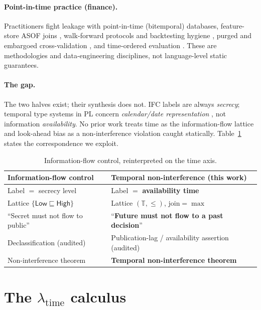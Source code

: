 \documentclass[11pt]{article}
\newcommand{\lt}{$\lambda_{\text{time}}$}
\theoremstyle{plain}
\theoremstyle{definition}
\begin{document}
\paragraph{Point-in-time practice (finance).}
Practitioners fight leakage with point-in-time (bitemporal) databases,
feature-store ASOF joins \citep{feast}, walk-forward protocols and backtesting
hygiene \citep{arnott2019backtesting}, purged and embargoed cross-validation
\citep{lopezdeprado2018advances}, and time-ordered evaluation
\citep{bergmeir2012use}. These are methodologies and data-engineering
disciplines, not language-level static guarantees.

\paragraph{The gap.}
The two halves exist; their synthesis does not. IFC labels are always
\emph{secrecy}; temporal type systems in PL concern \emph{calendar/date
representation} \citep{bry2005catts,tc39temporal}, not information
\emph{availability}. No prior work treats time as the information-flow lattice
and look-ahead bias as a non-interference violation caught statically.
Table~\ref{tab:mapping} states the correspondence we exploit.

\begin{table}[t]\centering\small
\begin{tabular}{ll}
\toprule
Information-flow control & Temporal non-interference (this work) \\
\midrule
Label $=$ secrecy level & Label $=$ \textbf{availability time} \\
Lattice $\{\textsf{Low}\sqsubseteq\textsf{High}\}$ & Lattice $(\mathbb{T},\le)$, $\text{join}=\max$ \\
``Secret must not flow to public'' & ``\textbf{Future must not flow to a past decision}'' \\
Declassification (audited) & Publication-lag / availability assertion (audited) \\
Non-interference theorem & \textbf{Temporal non-interference theorem} \\
\bottomrule
\end{tabular}
\caption{Information-flow control, reinterpreted on the time axis.}
\label{tab:mapping}
\end{table}

\section{The \lt{} calculus}\label{sec:calculus}
\end{document}
